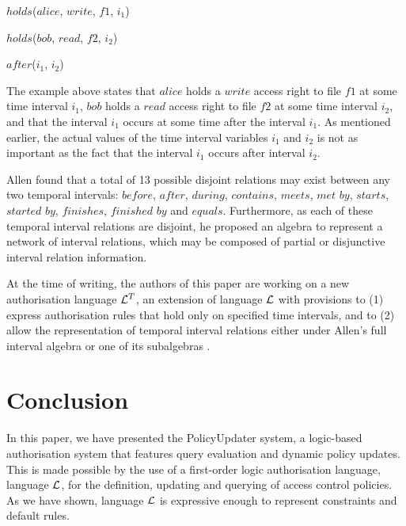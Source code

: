 \documentclass[glov2,twocolumn,final]{svjour2}
\newenvironment{vquote}
  {\begin{list}{}{\leftmargin 1em}\item[]}
  {\end{list}}
\begin{document}
    \begin{vquote}
      $holds$($alice$, $write$, $f1$, $i_{1}$)

      $holds$($bob$, $read$, $f2$, $i_{2}$)

      $after$($i_{1}$, $i_{2}$)
    \end{vquote}

    The example above states that $alice$ holds a $write$ access right to file
    $f1$ at some time interval $i_{1}$, $bob$ holds a $read$ access right to
    file $f2$ at some time interval $i_{2}$, and that the interval $i_{1}$
    occurs at some time after the interval $i_{1}$. As mentioned earlier, the
    actual values of the time interval variables $i_{1}$ and $i_{2}$ is not as
    important as the fact that the interval $i_{1}$ occurs after interval
    $i_{2}$.

    Allen \cite{AL} found that a total of 13 possible disjoint relations may
    exist between any two temporal intervals: $before$, $after$, $during$,
    $contains$, $meets$, $met$ $by$, $starts$, $started$ $by$, $finishes$,
    $finished$ $by$ and $equals$. Furthermore, as each of these temporal
    interval relations are disjoint, he proposed an algebra to represent a
    network of interval relations, which may be composed of partial or
    disjunctive interval relation information.

    At the time of writing, the authors of this paper are working on a new
    authorisation language ${\cal L}^{T}$, an extension of language ${\cal L}$
    with provisions to (1) express authorisation rules that hold only on
    specified time intervals, and to (2) allow the representation of temporal
    interval relations either under Allen's full interval algebra or one of its
    subalgebras \cite{KRO}.

  \section{Conclusion}
    \label{sec-conclusion}

    In this paper, we have presented the PolicyUpdater system, a logic-based
    authorisation system that features query evaluation and dynamic policy
    updates. This is made possible by the use of a first-order logic
    authorisation language, language ${\cal L}$, for the definition, updating
    and querying of access control policies. As we have shown, language
    ${\cal L}$ is expressive enough to represent constraints and default rules.
\end{document}
